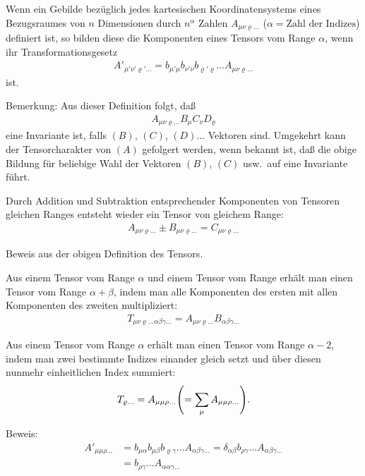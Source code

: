  Wenn ein Gebilde bezüglich 
jedes kartesischen Koordinatensystems eines Bezugsraumes von $n$ Dimensionen 
durch $n^{\alpha}$ Zahlen $A_{\mu\nu\varrho\ldots}$ ($\alpha = \text{Zahl der 
Indizes}$) definiert ist, so bilden diese die Komponenten eines Tensors vom 
Range $\alpha$, wenn ihr Transformationsgesetz
\begin{align}
A'_{\mu'\nu'\varrho' \ldots} = 
b_{\mu'\mu} b_{\nu'\nu} b_{\varrho'\varrho} \ldots A_{\mu\nu\varrho \ldots}
\label{eq:7}
\end{align}
ist.

Bemerkung: Aus dieser Definition folgt, daß
\begin{align}
A_{\mu\nu\varrho \ldots} B_{\mu} C_{\nu} D_{\varrho}
\label{eq:8}
\end{align}
eine Invariante ist, falls $(B)$, $(C)$, $(D) \ldots$ Vektoren sind. Umgekehrt 
kann der Tensorcharakter von $(A)$ gefolgert werden, wenn bekannt ist, daß die 
obige Bildung für beliebige Wahl der Vektoren $(B)$, $(C)$ usw.\ auf eine 
Invariante führt.

 Durch Addition und Subtraktion 
entsprechender Komponenten von Tensoren gleichen Ranges entsteht wieder ein 
Tensor von gleichem Range:
\begin{align}
A_{\mu\nu\varrho\ldots} \pm B_{\mu\nu\varrho\ldots} = C_{\mu\nu\varrho\ldots}
\label{eq:9}
\end{align}

Beweis aus der obigen Definition des Tensors.

 Aus einem Tensor vom Range $\alpha$ und einem Tensor vom 
Range \beta erhält man einen Tensor vom Range $\alpha + \beta$, indem man alle 
Komponenten des ersten mit allen Komponenten des zweiten multipliziert:
\begin{align}
T_{\mu\nu\varrho\ldots \alpha\beta\gamma\ldots} = A_{\mu\nu\varrho\ldots} 
B_{\alpha\beta\gamma\ldots}
\label{eq:10}
\end{align}

 Aus einem Tensor vom Range $\alpha$ erhält man einen Tensor 
vom Range $\alpha - 2$, indem man zwei bestimmte Indizes einander gleich setzt 
und über diesen nunmehr einheitlichen Index summiert:
\begin{align}
T_{\varrho\ldots} = A_{\mu\mu\rho\ldots} 
	{\left(= \sum_{\mu} A_{\mu\mu\rho\ldots}\right)}.
\label{eq:11}
\end{align}

Beweis:
\begin{align*}
A'_{\mu\mu\rho\ldots} &=
	b_{\mu\alpha} b_{\mu\beta} b_{\varrho\gamma} \ldots
	A_{\alpha\beta\gamma\ldots}
=
	\delta_{\alpha\beta} b_{\rho\gamma} \ldots
	A_{\alpha\beta\gamma\ldots}
\\
&=
b_{\rho\gamma} \ldots A_{\alpha\alpha\gamma\ldots}
\end{align*}

